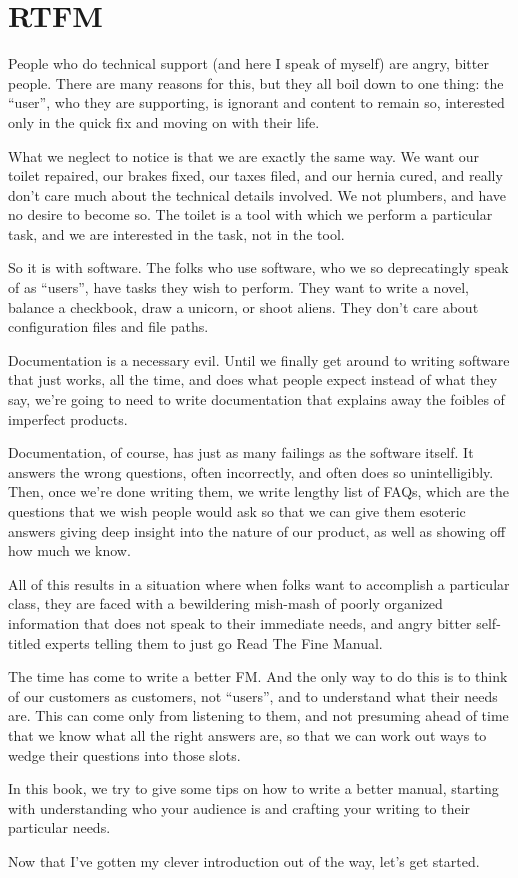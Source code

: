 \chapter{RTFM}

People who do technical support (and here I speak of myself)
are angry, bitter people. There are many
reasons for this, but they all boil down to one thing: the ``user'', who
they are supporting, is ignorant and content to remain so, interested
only in the quick fix and moving on with their life.

What we neglect to notice is that we are exactly the same way. We want
our toilet repaired, our brakes fixed, our taxes filed, and our hernia
cured, and really don't care much about the technical details involved.
We not plumbers, and have no desire to become so. The toilet is a tool
with which we perform a particular task, and we are interested in the
task, not in the tool.

So it is with software. The folks who use software, who we so
deprecatingly speak of as ``users'', have tasks they wish to perform.
They want to write a novel, balance a checkbook, draw a unicorn, or
shoot aliens. They don't care about configuration files and file paths.

Documentation is a necessary evil. Until we finally get around to
writing software that just works, all the time, and does what people
expect instead of what they say, we're going to need to write
documentation that explains away the foibles of imperfect products.

Documentation, of course, has just as many failings as the software
itself. It answers the wrong questions, often incorrectly, and often
does so unintelligibly. Then, once we're done writing them, we write
lengthy list of FAQs, which are the questions that we wish people would
ask so that we can give them esoteric answers giving deep insight into
the nature of our product, as well as showing off how much we know.

All of this results in a situation where when folks want to accomplish a
particular class, they are faced with a bewildering mish-mash of poorly
organized information that does not speak to their immediate needs, and
angry bitter self-titled experts telling them to just go Read The Fine
Manual.

The time has come to write a better FM. And the only way to do this is
to think of our customers as customers, not ``users'', and to understand
what their needs are. This can come only from listening to them, and not
presuming ahead of time that we know what all the right answers are, so
that we can work out ways to wedge their questions into those slots.

In this book, we try to give some tips on how to write a better manual,
starting with understanding who your audience is and crafting your
writing to their particular needs.

Now that I've gotten my clever introduction out of the way, let's get
started.

